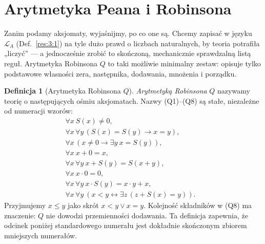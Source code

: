 \documentclass[11pt,a4paper]{article}
\numberwithin{equation}{section}
\theoremstyle{plain}
\theoremstyle{definition}
\newtheorem{definicja}[twierdzenie]{Definicja}
\theoremstyle{remark}
\begin{document}
\section{Arytmetyka Peana i Robinsona}\label{sec:arytmetyka-peana-robinsona}
Zanim podamy aksjomaty, wyjaśnijmy, po co one są. Chcemy zapisać w języku $\mathcal L_A$ (Def.~\ref{res:3:1}) na tyle dużo prawd o liczbach naturalnych, by teoria potrafiła „liczyć” --- a jednocześnie zrobić to skończoną, mechanicznie sprawdzalną listą reguł. Arytmetyka Robinsona $Q$ to taki możliwie minimalny zestaw: opisuje tylko podstawowe własności zera, następnika, dodawania, mnożenia i porządku.

\begin{definicja}[Arytmetyka Robinsona $Q$]\label{res:4:1}
\emph{Arytmetyką Robinsona} $Q$ nazywamy teorię o następujących ośmiu aksjomatach. Nazwy (Q1)--(Q8) są stałe, niezależne od numeracji wzorów:
\begin{align*}
\forall x\ S(x)\ne0, &\tag{Q1}\\
\forall x\,\forall y\,(S(x)=S(y)\to x=y), &\tag{Q2}\\
\forall x\,(x\ne0\to\exists y\ x=S(y)), &\tag{Q3}\\
\forall x\ x+0=x, &\tag{Q4}\\
\forall x\,\forall y\ x+S(y)=S(x+y), &\tag{Q5}\\
\forall x\ x\cdot0=0, &\tag{Q6}\\
\forall x\,\forall y\ x\cdot S(y)=x\cdot y+x, &\tag{Q7}\\
\forall x\,\forall y\ (x<y\leftrightarrow\exists z\,(z+S(x)=y)). &\tag{Q8}
\end{align*}
Przyjmujemy $x\le y$ jako skrót $x<y\lor x=y$. Kolejność składników w (Q8) ma znaczenie: $Q$ nie dowodzi przemienności dodawania. Ta definicja zapewnia, że odcinek poniżej standardowego numerału jest dokładnie skończonym zbiorem mniejszych numerałów.
\end{definicja}
\end{document}
